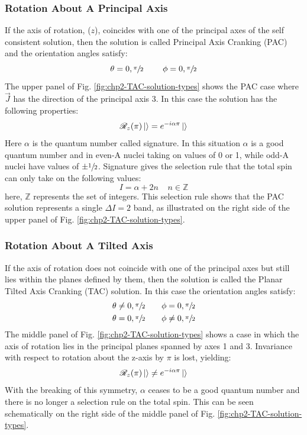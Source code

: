 \subsubsection{Rotation About A Principal Axis}
\label{sssec:models-tac-pac}
If the axis of rotation, ($z$), coincides with one of the principal axes of the self consistent solution, then the solution is called Principal Axis Cranking (PAC) and the orientation angles satisfy:
\begin{equation}
\label{eqn:chp2-PAC-angle-conditions}
\theta = 0, \sfrac{\pi}{2}~~~~~~~ \phi= 0, \sfrac{\pi}{2}
\end{equation}
The upper panel of Fig. \ref{fig:chp2-TAC-solution-types} shows the PAC case where $\vec{J}$ has the direction of the principal axis 3. In this case the solution has the following properties:
\begin{equation}
\label{eqn:chp2=TAC-PAC-sol-prop}
\mathscr{R}_z(\pi)\Ket{}=e^{-i\alpha\pi}\Ket{}
\end{equation}
Here $\alpha$ is the quantum number called signature. In this situation $\alpha$ is a good quantum number and in even-A nuclei taking on values of 0 or 1, while odd-A nuclei have values of $\pm\sfrac{1}{2}$. Signature gives the selection rule that the total spin can only take on the following values:
\begin{equation}
\label{eqn:chp2=TAC-PAC-spin-sel-rule}
I=\alpha+2n ~~~~~n\in{}\mathds{Z}
\end{equation}
here, $\mathds{Z}$ represents the set of integers. This selection rule shows that the PAC solution represents a single $\Delta{}I=2$ band, as illustrated on the right side of the upper panel of Fig. \ref{fig:chp2-TAC-solution-types}.

\subsubsection{Rotation About A Tilted Axis}
\label{sssec:models-tac-tac}
If the axis of rotation does not coincide with one of the principal axes but still lies within the planes defined by them, then the solution is called the Planar Tilted Axis Cranking (TAC) solution. In this case the orientation angles satisfy:
\begin{align}
\theta &\neq{} 0, \sfrac{\pi}{2} ~~~~~~ \phi=0, \sfrac{\pi}{2}\\
\theta &= 0, \sfrac{\pi}{2} ~~~~~~ \phi\neq{}0, \sfrac{\pi}{2}
\end{align}
The middle panel of Fig. \ref{fig:chp2-TAC-solution-types} shows a case in which the axis of rotation lies in the principal planes spanned by axes 1 and 3. Invariance with respect to rotation about the z-axis by $\pi$ is lost, yielding:
\begin{equation}
\label{eqn:chp2=TAC-TAC-sol-prop}
\mathscr{R}_z(\pi)\Ket{}\neq{}e^{-i\alpha\pi}\Ket{}
\end{equation}
With the breaking of this symmetry, $\alpha$ ceases to be a good quantum number and there is no longer a selection rule on the total spin. This can be seen schematically on the right side of the middle panel of Fig. \ref{fig:chp2-TAC-solution-types}.

